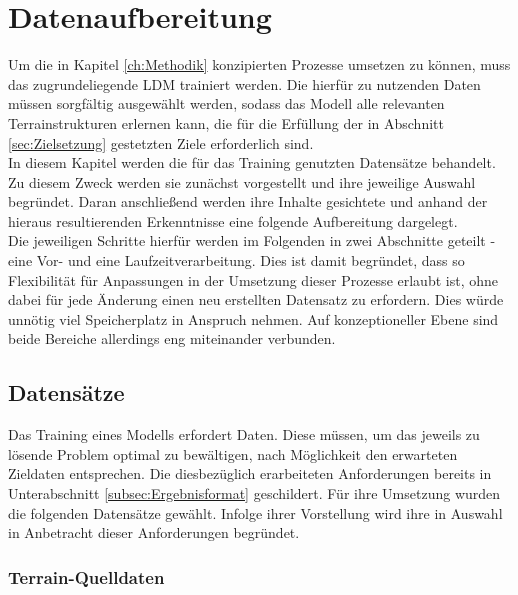 \chapter{Datenaufbereitung}
\label{ch:Datenaufbereitung}

Um die in Kapitel \ref{ch:Methodik} konzipierten Prozesse umsetzen zu können, muss das zugrundeliegende \ac{LDM} trainiert werden. Die hierfür zu nutzenden Daten müssen sorgfältig ausgewählt werden, sodass das Modell alle relevanten Terrainstrukturen erlernen kann, die für die Erfüllung der in Abschnitt \ref{sec:Zielsetzung} gestetzten Ziele erforderlich sind. \\
In diesem Kapitel werden die für das Training genutzten Datensätze behandelt. Zu diesem Zweck werden sie zunächst vorgestellt und ihre jeweilige Auswahl begründet. Daran anschließend werden ihre Inhalte gesichtete und anhand der hieraus resultierenden Erkenntnisse eine folgende Aufbereitung dargelegt. \\
Die jeweiligen Schritte hierfür werden im Folgenden in zwei Abschnitte geteilt - eine Vor- und eine Laufzeitverarbeitung. Dies ist damit begründet, dass so Flexibilität für Anpassungen in der Umsetzung dieser Prozesse erlaubt ist, ohne dabei für jede Änderung einen neu erstellten Datensatz zu erfordern. Dies würde unnötig viel Speicherplatz in Anspruch nehmen. Auf konzeptioneller Ebene sind beide Bereiche allerdings eng miteinander verbunden.

\section{Datensätze}

Das Training eines Modells erfordert Daten. Diese müssen, um das jeweils zu lösende Problem optimal zu bewältigen, nach Möglichkeit den erwarteten Zieldaten entsprechen. Die diesbezüglich erarbeiteten Anforderungen bereits in Unterabschnitt \ref{subsec:Ergebnisformat} geschildert. Für ihre Umsetzung wurden die folgenden Datensätze gewählt. Infolge ihrer Vorstellung wird ihre in Auswahl in Anbetracht dieser Anforderungen begründet.

\subsection{Terrain-Quelldaten}

